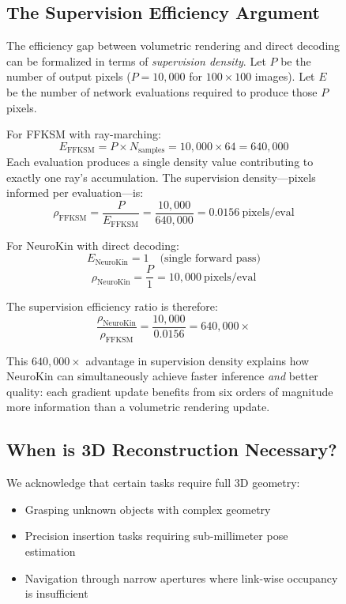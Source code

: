 \documentclass[12pt,a4paper,oneside]{report}
\begin{document}
\begin{figure}[H]
\subsection{The Supervision Efficiency Argument}

The efficiency gap between volumetric rendering and direct decoding can be formalized in terms of \textit{supervision density}. Let $P$ be the number of output pixels ($P = 10,000$ for $100 \times 100$ images). Let $E$ be the number of network evaluations required to produce those $P$ pixels.

For FFKSM with ray-marching:
\begin{equation}
E_{\text{FFKSM}} = P \times N_{\text{samples}} = 10,000 \times 64 = 640,000
\end{equation}
Each evaluation produces a single density value contributing to exactly one ray's accumulation. The supervision density---pixels informed per evaluation---is:
\begin{equation}
\rho_{\text{FFKSM}} = \frac{P}{E_{\text{FFKSM}}} = \frac{10,000}{640,000} = 0.0156\ \text{pixels/eval}
\end{equation}

For NeuroKin with direct decoding:
\begin{equation}
E_{\text{NeuroKin}} = 1 \quad \text{(single forward pass)}
\end{equation}
\begin{equation}
\rho_{\text{NeuroKin}} = \frac{P}{1} = 10,000\ \text{pixels/eval}
\end{equation}

The supervision efficiency ratio is therefore:
\begin{equation}
\frac{\rho_{\text{NeuroKin}}}{\rho_{\text{FFKSM}}} = \frac{10,000}{0.0156} = 640,000\times
\end{equation}

This $640,000\times$ advantage in supervision density explains how NeuroKin can simultaneously achieve faster inference \textit{and} better quality: each gradient update benefits from six orders of magnitude more information than a volumetric rendering update.

\subsection{When is 3D Reconstruction Necessary?}

We acknowledge that certain tasks require full 3D geometry:
\begin{itemize}
    \item Grasping unknown objects with complex geometry
    \item Precision insertion tasks requiring sub-millimeter pose estimation
    \item Navigation through narrow apertures where link-wise occupancy is insufficient
\end{itemize}


\end{figure}
\end{document}
